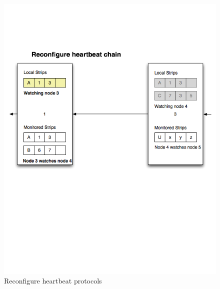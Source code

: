 \begin{figure}[h!]
\caption{Reconfigure heartbeat protocols}
\label{fig:strip9}
\centering
    \includegraphics[width=\linewidth]{figures/strip9}
\end{figure}

